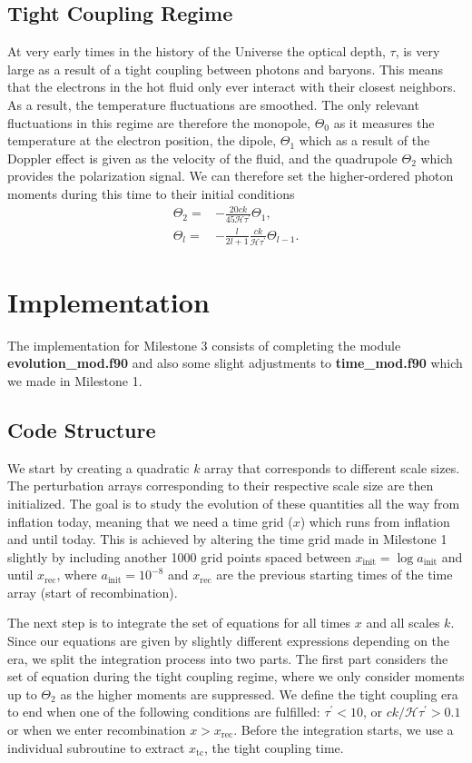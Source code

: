 \documentclass[a4paper, 10pt, reqno]{amsart}
\begin{document}
\subsection{Tight Coupling Regime}
At very early times in the history of the Universe the optical depth, $\tau$, is very large as a result of a tight coupling between photons and baryons. This means that the electrons in the hot fluid only ever interact with their closest neighbors. As a result, the temperature fluctuations are smoothed. The only relevant fluctuations in this regime are therefore the monopole, $\Theta_0$ as it measures the temperature at the electron position, the dipole, $\Theta_1$ which as a result of the Doppler effect is given as the velocity of the fluid, and the quadrupole $\Theta_2$ which provides the polarization signal. We can therefore set the higher-ordered photon moments during this time to their initial conditions
\begin{align}
    \Theta_{2}= & -\frac{20 c k}{45 \mathcal{H} \tau^{\prime}} \Theta_{1},\\
    \Theta_{l}= & -\frac{l}{2 l+1} \frac{c k}{\mathcal{H} \tau^{\prime}}
    \Theta_{l-1}.
\end{align}

\section{Implementation}
The implementation for Milestone 3 consists of completing the module \textbf{evolution\_mod.f90} and also some slight adjustments to \textbf{time\_mod.f90} which we made in Milestone 1.

\subsection{Code Structure}
We start by creating a quadratic $k$ array that corresponds to different scale sizes. The perturbation arrays corresponding to their respective scale size are then initialized. The goal is to study the evolution of these quantities all the way from inflation today, meaning that we need a time grid ($x$) which runs from inflation and until today. This is achieved by altering the time grid made in Milestone 1 slightly by including another 1000 grid points spaced between $x_\mathrm{init} = \log a_\mathrm{init}$ and until $x_\mathrm{rec}$, where $a_\mathrm{init} = 10^{-8}$ and $x_\mathrm{rec}$ are the previous starting times of the time array (start of recombination). 

The next step is to integrate the set of equations for all times $x$ and all scales $k$. Since our equations are given by slightly different expressions depending on the era, we split the integration process into two parts. The first part considers the set of equation during the tight coupling regime, where we only consider moments up to $\Theta_2$ as the higher moments are suppressed. We define the tight coupling era to end when one of the following conditions are fulfilled: $\tau^\prime < 10$, or $ck/\mathcal{H}\tau^\prime > 0.1$ or when we enter recombination $x > x_\mathrm{rec}$. Before the integration starts, we use a individual subroutine to extract $x_{\mathrm{tc}}$, the tight coupling time.
\end{document}
